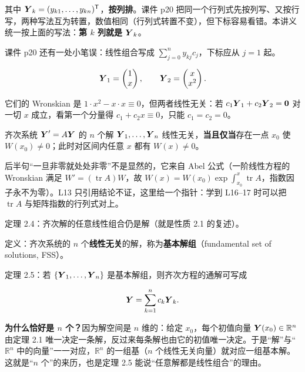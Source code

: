 \documentclass[11pt]{ctexart}
\newcommand{\mat}[1]{\begin{pmatrix}#1\end{pmatrix}}
\newcommand{\tr}{\operatorname{tr}}
\begin{document}
其中 $\boldsymbol{Y}_k=(y_{k1},\dots,y_{kn})^{\mathsf T}$，\textbf{按列排}。课件 p20 把同一个行列式先按列写、又按行写，两种写法互为转置，数值相同（行列式转置不变），但下标容易看错。本讲义统一按上面的写法：\textbf{第 $k$ 列就是 $\boldsymbol{Y}_k$}。

课件 p20 还有一处小笔误：线性组合写成 $\sum_{j=0}^{n}y_{kj}c_j$，下标应从 $j=1$ 起。


\[
\vect{Y}_1=\mat{1\\ x},\qquad \vect{Y}_2=\mat{x\\ x^2}.
\]

它们的 Wronskian 是 $1\cdot x^2-x\cdot x\equiv0$，但两者线性无关：若 $c_1\boldsymbol{Y}_1+c_2\boldsymbol{Y}_2=\boldsymbol{0}$ 对一切 $x$ 成立，看第一个分量得 $c_1+c_2x\equiv0$，只能 $c_1=c_2=0$。



齐次系统 $\boldsymbol{Y}'=A\boldsymbol{Y}$ 的 $n$ 个解 $\boldsymbol{Y}_1,\dots,\boldsymbol{Y}_n$ 线性无关，\textbf{当且仅当}存在一点 $x_0$ 使 $W(x_0)\neq0$；此时对区间内任意 $x$ 都有 $W(x)\neq0$。

后半句“一旦非零就处处非零”不是显然的，它来自 Abel 公式（一阶线性方程的 Wronskian 满足 $W'=(\tr A)W$，故 $W(x)=W(x_0)\exp\int_{x_0}^{x}\tr A$，指数因子永不为零）。L13 只引用结论不证，这里给一个指针：学到 L16--17 时可以把 $\tr A$ 与矩阵指数的行列式对上。


定理 2.4：齐次解的任意线性组合仍是解（就是性质 2.1 的复述）。

定义：齐次系统的 $n$ 个\textbf{线性无关}的解，称为\textbf{基本解组}（fundamental set of solutions, FSS）。

定理 2.5：若 $\{\boldsymbol{Y}_1,\dots,\boldsymbol{Y}_n\}$ 是基本解组，则齐次方程的通解可写成

\[
\boldsymbol{Y}=\sum_{k=1}^{n}c_k\boldsymbol{Y}_k .
\]

\textbf{为什么恰好是 $n$ 个？}因为解空间是 $n$ 维的：给定 $x_0$，每个初值向量 $\boldsymbol{Y}(x_0)\in\mathbb{R}^n$ 由定理 2.1 唯一决定一条解，反过来每条解也由它的初值唯一决定。于是“解”与“$\mathbb{R}^n$ 中的向量”一一对应，$\mathbb{R}^n$ 的一组基（$n$ 个线性无关向量）就对应一组基本解。这就是“$n$ 个”的来历，也是定理 2.5 能说“任意解都是线性组合”的理由。
\end{document}
